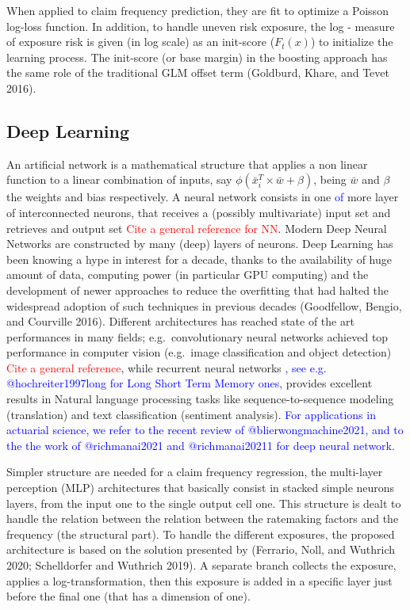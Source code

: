 \documentclass[
]{article}
\begin{document}
When applied to claim frequency prediction, they are fit to optimize a
Poisson log-loss function. In addition, to handle uneven risk exposure,
the log - measure of exposure risk is given (in log scale) as an
init-score (\(F_t\left(x\right)\)) to initialize the learning process.
The init-score (or base margin) in the boosting approach has the same
role of the traditional GLM offset term (Goldburd, Khare, and Tevet
2016).

\hypertarget{deep-learning}{%
\subsection{Deep Learning}\label{deep-learning}}

An artificial network is a mathematical structure that applies a non
linear function to a linear combination of inputs, say
\(\phi\left(\bar x_i^T \times \bar w+\beta\right)\), being \(\bar w\)
and \(\beta\) the weights and bias respectively. A neural network
consists in one \textcolor{blue}{of} more layer of interconnected
neurons, that receives a (possibly multivariate) input set and retrieves
and output set \textcolor{red}{Cite a general reference for NN}. Modern
Deep Neural Networks are constructed by many (deep) layers of neurons.
Deep Learning has been knowing a hype in interest for a decade, thanks
to the availability of huge amount of data, computing power (in
particular GPU computing) and the development of newer approaches to
reduce the overfitting that had halted the widespread adoption of such
techniques in previous decades (Goodfellow, Bengio, and Courville 2016).
Different architectures has reached state of the art performances in
many fields; e.g.~convolutionary neural networks achieved top
performance in computer vision (e.g.~image classification and object
detection) \textcolor{red}{Cite a general reference}, while recurrent
neural networks
\textcolor{blue}{, see e.g. @hochreiter1997long for Long Short Term Memory ones},
provides excellent results in Natural language processing tasks like
sequence-to-sequence modeling (translation) and text classification
(sentiment analysis).
\textcolor{blue}{For applications in actuarial science, we refer to the recent review of @blierwongmachine2021, and to the the work of 
@richmanai2021 and @richmanai20211 for deep neural network.}

Simpler structure are needed for a claim frequency regression, the
multi-layer perception (MLP) architectures that basically consist in
stacked simple neurons layers, from the input one to the single output
cell one. This structure is dealt to handle the relation between the
relation between the ratemaking factors and the frequency (the
structural part). To handle the different exposures, the proposed
architecture is based on the solution presented by (Ferrario, Noll, and
Wuthrich 2020; Schelldorfer and Wuthrich 2019). A separate branch
collects the exposure, applies a log-transformation, then this exposure
is added in a specific layer just before the final one (that has a
dimension of one).
\end{document}
